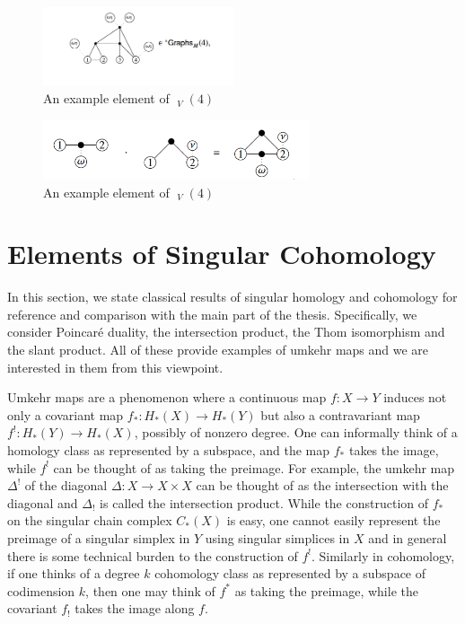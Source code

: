 \documentclass{scrartcl}
\theoremstyle{plain}
\theoremstyle{definition}
\DeclareMathOperator{\coGraphs}{{}^*Graphs}
\begin{document}
\begin{figure}[ht]
    \centering
    \includegraphics[width=0.5\textwidth]{img/cw-graphs-ast-example.png}
    \caption{An example element of $\coGraphs_V(4)$}\label{cw-graphs-ast-example.png}
\end{figure}    
\begin{figure}[ht]
    \centering
    \includegraphics[width=0.7\textwidth]{img/cw-graphs-mult.png}
    \caption{An example element of $\coGraphs_V(4)$}\label{cw-graphs-mult}
\end{figure}



\newpage
\appendix





\section{Elements of Singular Cohomology}

In this section, we state classical results of singular homology and cohomology for reference and comparison with the main part of the thesis. Specifically, we consider Poincaré duality, the intersection product, the Thom isomorphism and the slant product. All of these provide examples of umkehr maps and we are interested in them from this viewpoint. 

Umkehr maps are a phenomenon where a continuous map $f\colon X\to Y$ induces not only a covariant map $f_*\colon H_*(X)\to H_*(Y)$ but also a contravariant map $f^!\colon H_*(Y)\to H_*(X)$, possibly of nonzero degree. One can informally think of a homology class as represented by a subspace, and the map $f_*$ takes the image, while $f^!$ can be thought of as taking the preimage. For example, the umkehr map $\Delta^!$ of the diagonal $\Delta\colon X\to X\times X$ can be thought of as the intersection with the diagonal and $\Delta_!$ is called the intersection product. While the construction of $f_*$ on the singular chain complex $C_*(X)$ is easy, one cannot easily represent the preimage of a singular simplex in $Y$ using singular simplices in $X$ and in general there is some technical burden to the construction of $f^!$. Similarly in cohomology, if one thinks of a degree $k$ cohomology class as represented by a subspace of codimension $k$, then one may think of $f^*$ as taking the preimage, while the covariant $f_!$ takes the image along $f$. 
\end{document}

